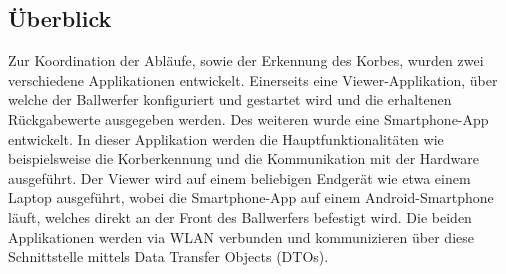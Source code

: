 \subsection{Überblick}
Zur Koordination der Abläufe, sowie der Erkennung des Korbes, wurden zwei 
verschiedene Applikationen entwickelt. Einerseits eine Viewer-Applikation, 
über welche der Ballwerfer konfiguriert und gestartet wird und die erhaltenen
Rückgabewerte ausgegeben werden. Des weiteren wurde eine Smartphone-App entwickelt. 
In dieser Applikation werden die Hauptfunktionalitäten wie beispielsweise die 
Korberkennung und die Kommunikation mit der Hardware
ausgeführt. Der Viewer wird auf einem beliebigen Endgerät wie etwa 
einem Laptop ausgeführt, wobei die Smartphone-App auf einem Android-Smartphone läuft, 
welches direkt an der Front des Ballwerfers befestigt wird. Die beiden Applikationen 
werden via WLAN verbunden und kommunizieren über diese Schnittstelle mittels 
Data Transfer Objects (DTOs).
